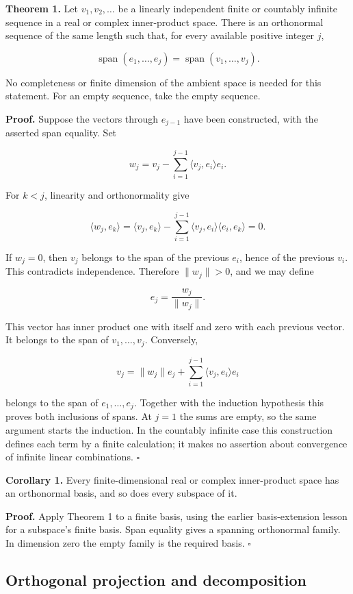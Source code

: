 \documentclass[
  english,
]{article}
\begin{document}
\textbf{Theorem 1.} Let \(v_1,v_2,\ldots\) be a linearly independent
finite or countably infinite sequence in a real or complex inner-product
space. There is an orthonormal sequence of the same length such that,
for every available positive integer \(j\),

\[
\operatorname{span}(e_1,\ldots,e_j)=\operatorname{span}(v_1,\ldots,v_j).
\]

No completeness or finite dimension of the ambient space is needed for
this statement. For an empty sequence, take the empty sequence.

\textbf{Proof.} Suppose the vectors through \(e_{j-1}\) have been
constructed, with the asserted span equality. Set

\[
w_j=v_j-\sum_{i=1}^{j-1}\langle v_j,e_i\rangle e_i.
\]

For \(k<j\), linearity and orthonormality give

\[
\langle w_j,e_k\rangle
=\langle v_j,e_k\rangle-\sum_{i=1}^{j-1}\langle v_j,e_i\rangle\langle e_i,e_k\rangle=0.
\]

If \(w_j=0\), then \(v_j\) belongs to the span of the previous \(e_i\),
hence of the previous \(v_i\). This contradicts independence. Therefore
\(\|w_j\|>0\), and we may define

\[
e_j=\frac{w_j}{\|w_j\|}.
\]

This vector has inner product one with itself and zero with each
previous vector. It belongs to the span of \(v_1,\ldots,v_j\).
Conversely,

\[
v_j=\|w_j\|e_j+\sum_{i=1}^{j-1}\langle v_j,e_i\rangle e_i
\]

belongs to the span of \(e_1,\ldots,e_j\). Together with the induction
hypothesis this proves both inclusions of spans. At \(j=1\) the sums are
empty, so the same argument starts the induction. In the countably
infinite case this construction defines each term by a finite
calculation; it makes no assertion about convergence of infinite linear
combinations. \(\square\)

\textbf{Corollary 1.} Every finite-dimensional real or complex
inner-product space has an orthonormal basis, and so does every subspace
of it.

\textbf{Proof.} Apply Theorem 1 to a finite basis, using the earlier
basis-extension lesson for a subspace's finite basis. Span equality
gives a spanning orthonormal family. In dimension zero the empty family
is the required basis. \(\square\)

\subsection{Orthogonal projection and
decomposition}\label{orthogonal-projection-and-decomposition}
\end{document}
